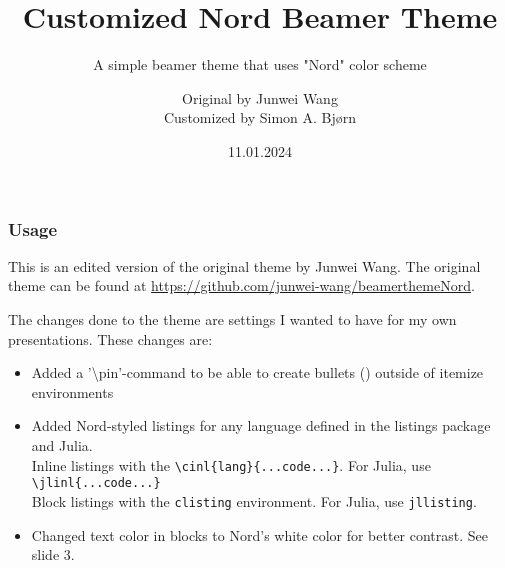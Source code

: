 \documentclass[compress,aspectratio=169]{beamer}
\title{Customized Nord Beamer Theme}
\subtitle{A simple beamer theme that uses "Nord" color scheme}
\author{Original by Junwei Wang \texorpdfstring{\\ Customized by Simon A. Bjørn}{}}
\institute{University of Oslo}
\date{11.01.2024}
\begin{document}
\begin{frame}
    \maketitle
\end{frame}

\begin{frame}
    \frametitle{Usage}
    This is an edited version of the original theme by Junwei Wang. The original theme can be found at \url{https://github.com/junwei-wang/beamerthemeNord}.

    \vspace{1em}

    The changes done to the theme are settings I wanted to have for my own presentations. These changes are:
    \begin{itemize}
        \item Added a '{\textbackslash}pin'-command to be able to create bullets (\pin) outside of itemize environments
        \item Added Nord-styled listings for any language defined in the listings package and Julia. \\
        Inline listings with the \texttt{{\textbackslash}cinl\{lang\}\{...code...\}}. For Julia, use \texttt{{\textbackslash}jlinl\{...code...\}} \\
        Block listings with the \texttt{clisting} environment. For Julia, use \texttt{jllisting}.
        \item Changed text color in blocks to Nord's white color for better contrast. See slide 3.
            
    \end{itemize}
\end{frame}
\end{document}
